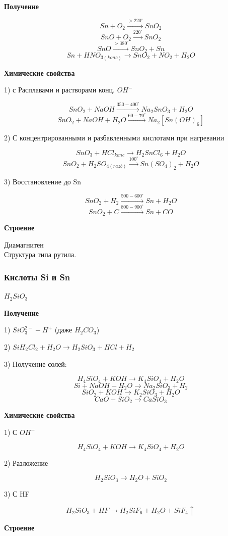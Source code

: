 \documentclass[14pt,a4paper]{scrartcl}
\begin{document}
\textbf{Получение}

$$Sn + O_2 \xrightarrow{>220^{\circ}} SnO_2$$
$$SnO + O_2 \xrightarrow{220^{\circ}} SnO_2$$
$$SnO \xrightarrow{>380^{\circ}} SnO_2 + Sn$$
$$Sn + HNO_{3(konc)}\rightarrow SnO_2 + NO_2 + H_2O$$

\textbf{Химические свойства}

1) с Расплавами и  растворами конц. $OH^-$

$$SnO_2 + NaOH \xrightarrow{350-400^{\circ}} Na_2SnO_3 + H_2O$$
$$SnO_2 + NaOH + H_2O\xrightarrow{60-70^{\circ}} Na_2[Sn(OH)_6]$$

2) С концентрированными и разбавленными кислотами при нагревании

$$SnO_3 + HCl_{konc} \rightarrow H_2SnCl_6 + H_2O$$
$$SnO_2 + H_2SO_{4(razb)} \xrightarrow{100^{\circ}} Sn(SO_4)_2 + H_2O$$

3) Восстановление до Sn

$$SnO_2 + H_2 \xrightarrow{500-600^{\circ}} Sn + H_2O$$
$$SnO_2 + C \xrightarrow{800-900^{\circ}} Sn + CO$$

\textbf{Строение}

Диамагнитен\\
Структура типа рутила.

\subsubsection{Кислоты Si и Sn}

$H_2SiO_3$

\textbf{Получение}

1) $SiO_3^{2-} + H^+$ (даже $H_2CO_3$)

2) $SiH_2Cl_2 + H_2O \rightarrow H_2SiO_3 + HCl + H_2$

3) Получение солей:

$$H_4SiO_4 + KOH \rightarrow K_4SiO_4 + H_2O$$
$$Si + NaOH + H_2O \rightarrow Na_2SiO_3 + H_2$$
$$SiO_2 + KOH \rightarrow K_2SiO_3 + H_2O$$
$$CaO + SiO_2 \rightarrow CaSiO_3$$

\textbf{Химические свойства}

1) С $OH^-$

$$H_4SiO_4 + KOH \rightarrow K_4SiO_4 + H_2O$$

2) Разложение 

$$H_2SiO_3 \rightarrow H_2O + SiO_2$$

3) С HF

$$H_2SiO_3 + HF \rightarrow H_2SiF_6 + H_2O + SiF_4\uparrow$$

\textbf{Строение}
\end{document}
